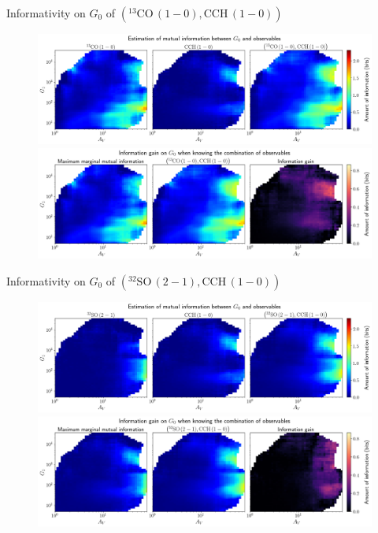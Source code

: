 \documentclass{beamer}
\begin{document}
\begin{frame}{Informativity on $G_0$ of $\left(\mathrm{^{13}CO\,(1-0)},\mathrm{CCH\,(1-0)}\right)$}
    \begin{figure}
        \centering
        \includegraphics[width=0.95\linewidth]{../mi/g0__13co10_cch10_mi.png}
        \vfill
        \includegraphics[width=0.95\linewidth]{../mi/g0__13co10_cch10_mi_gain.png}
    \end{figure}
\end{frame}

\begin{frame}{Informativity on $G_0$ of $\left(\mathrm{^{32}SO\,(2-1)},\mathrm{CCH\,(1-0)}\right)$}
    \begin{figure}
        \centering
        \includegraphics[width=0.95\linewidth]{../mi/g0__32so21_cch10_mi.png}
        \vfill
        \includegraphics[width=0.95\linewidth]{../mi/g0__32so21_cch10_mi_gain.png}
    \end{figure}
\end{frame}
\end{document}
